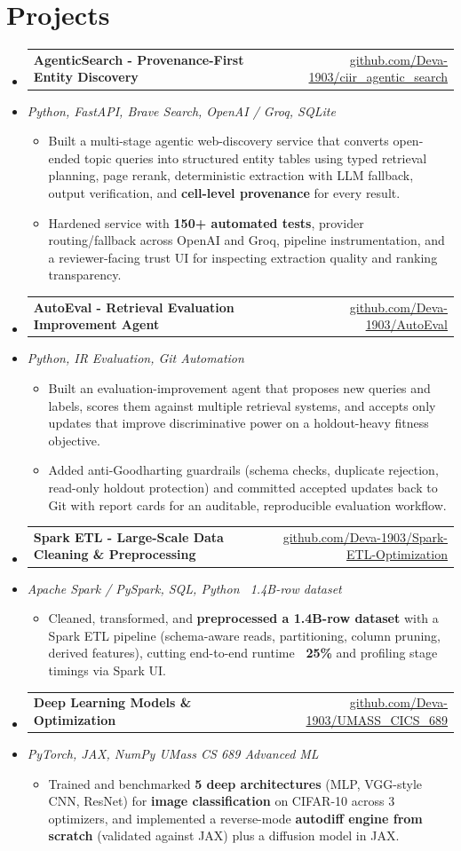 \documentclass[letterpaper,10pt]{article}
\makeatletter
\newcommand{\resumeItem}[1]{
  \item\small{#1\vspace{-1pt}}
}
\newcommand{\resumeProjectHeading}[2]{
    \item
    \begin{tabular*}{0.985\textwidth}[t]{l@{\extracolsep{\fill}}r}
      \small\textbf{#1} & \small #2 \\
    \end{tabular*}\vspace{-5pt}
}
\newcommand{\resumeProjectSubheading}[1]{
  \vspace{-2pt}\item[] {\small\textcolor{ResumeSlate}{\emph{#1}}}\vspace{-3pt}
}
\newcommand{\resumeSubHeadingListStart}{\begin{itemize}[leftmargin=0.0in, label={}, itemsep=2pt, topsep=2pt]}
\newcommand{\resumeSubHeadingListEnd}{\end{itemize}}
\newcommand{\resumeItemListStart}{\begin{itemize}[leftmargin=0.18in, itemsep=2pt, topsep=1pt]}
\newcommand{\resumeItemListEnd}{\end{itemize}\vspace{-4pt}}
\makeatother
\begin{document}
\section{Projects}
\resumeSubHeadingListStart
  \resumeProjectHeading
    {AgenticSearch - Provenance-First Entity Discovery}
    {\href{https://github.com/Deva-1903/ciir_agentic_search}{github.com/Deva-1903/ciir\_agentic\_search}}
  \resumeProjectSubheading{Python, FastAPI, Brave Search, OpenAI / Groq, SQLite}
    \resumeItemListStart
      \resumeItem{Built a multi-stage agentic web-discovery service that converts open-ended topic queries into structured entity tables using typed retrieval planning, page rerank, deterministic extraction with LLM fallback, output verification, and \textbf{cell-level provenance} for every result.}
      \resumeItem{Hardened service with \textbf{150+ automated tests}, provider routing/fallback across OpenAI and Groq, pipeline instrumentation, and a reviewer-facing trust UI for inspecting extraction quality and ranking transparency.}
    \resumeItemListEnd
  \resumeProjectHeading
    {AutoEval - Retrieval Evaluation Improvement Agent}
    {\href{https://github.com/Deva-1903/AutoEval}{github.com/Deva-1903/AutoEval}}
  \resumeProjectSubheading{Python, IR Evaluation, Git Automation}
    \resumeItemListStart
      \resumeItem{Built an evaluation-improvement agent that proposes new queries and labels, scores them against multiple retrieval systems, and accepts only updates that improve discriminative power on a holdout-heavy fitness objective.}
      \resumeItem{Added anti-Goodharting guardrails (schema checks, duplicate rejection, read-only holdout protection) and committed accepted updates back to Git with report cards for an auditable, reproducible evaluation workflow.}
    \resumeItemListEnd
  \resumeProjectHeading
    {Spark ETL - Large-Scale Data Cleaning \& Preprocessing}
    {\href{https://github.com/Deva-1903/Spark-ETL-Optimization}{github.com/Deva-1903/Spark-ETL-Optimization}}
  \resumeProjectSubheading{Apache Spark / PySpark, SQL, Python \enspace\textbar\enspace ~1.4B-row dataset}
    \resumeItemListStart
      \resumeItem{Cleaned, transformed, and \textbf{preprocessed a 1.4B-row dataset} with a Spark ETL pipeline (schema-aware reads, partitioning, column pruning, derived features), cutting end-to-end runtime \textbf{~25\%} and profiling stage timings via Spark UI.}
    \resumeItemListEnd
  \resumeProjectHeading
    {Deep Learning Models \& Optimization}
    {\href{https://github.com/Deva-1903/UMASS_CICS_689}{github.com/Deva-1903/UMASS\_CICS\_689}}
  \resumeProjectSubheading{PyTorch, JAX, NumPy \enspace\textbar\enspace UMass CS 689 Advanced ML}
    \resumeItemListStart
      \resumeItem{Trained and benchmarked \textbf{5 deep architectures} (MLP, VGG-style CNN, ResNet) for \textbf{image classification} on CIFAR-10 across 3 optimizers, and implemented a reverse-mode \textbf{autodiff engine from scratch} (validated against JAX) plus a diffusion model in JAX.}
    \resumeItemListEnd
\resumeSubHeadingListEnd
\vspace{-4pt}
\end{document}

